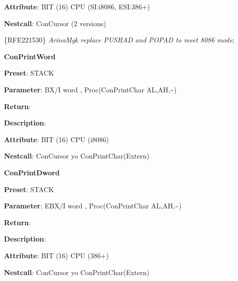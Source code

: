 \textbf{Attribute}: BIT (16) CPU (SI:i8086, ESI:386+)

\textbf{Nestcall}: ConCursor (2 versions)

\{RFE221530\} \textit{ArinaMgk replace PUSHAD and POPAD to meet 8086 mode};

\textbf{ConPrintWord}

\textbf{Preset}: STACK

\textbf{Parameter}: BX/I word , Proc(ConPrintChar AL,AH,\textasciitilde{})

\textbf{Return}:

\textbf{Description}:

\textbf{Attribute}: BIT (16) CPU (i8086)

\textbf{Nestcall}: ConCursor yo ConPrintChar(Extern)

\textbf{ConPrintDword}

\textbf{Preset}: STACK

\textbf{Parameter}: EBX/I word , Proc(ConPrintChar AL,AH,\textasciitilde{})

\textbf{Return}:

\textbf{Description}:

\textbf{Attribute}: BIT (16) CPU (386+)

\textbf{Nestcall}: ConCursor yo ConPrintChar(Extern)

